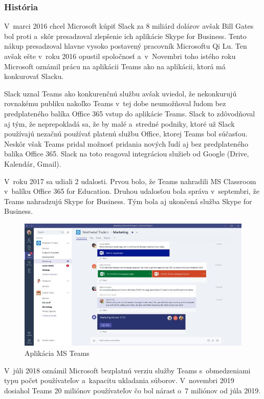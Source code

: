\subsubsection{História}
\indent V marci 2016 chcel Microsoft kúpiť Slack za 8 miliárd dolárov avšak Bill Gates bol proti a skôr presadzoval zlepšenie ich aplikácie Skype for Business. Tento nákup presadzoval hlavne vysoko postavený pracovník Microsoftu Qi Lu. Ten avšak ešte v roku 2016 opustil spoločnosť a v Novembri toho istého roku Microsoft oznámil prácu na aplikácii Teams ako na aplikácii, ktorá má konkurovať Slacku. 

\indent Slack uznal Teams ako konkurenčnú službu avšak uviedol, že nekonkurujú rovnakému publiku nakoľko Teams v tej dobe neumožňoval ľudom bez predplateného balíka Office 365 vstup do aplikácie Teams. Slack to zdôvodňoval aj tým, že neprepokladá sa, že by malé a stredné podniky, ktoré už Slack používajú nezačnú používať platenú službu Office, ktorej Teams bol súčasťou. Neskôr však Teams pridal možnosť pridania nových ľudí aj bez predplateného balíka Office 365. Slack na toto reagoval integráciou služieb od Google (Drive, Kalendár, Gmail). 

\indent V roku 2017 sa udiali 2 udalosti. Prvou bolo, že Teams nahradili MS Classroom v balíku Office 365 for Education. Druhou udalosťou bola správa v septembri, že Teams nahradzujú Skype for Business. Tým bola aj ukončená služba Skype for Business. 

\begin{figure}[H]
    \centering
    \includegraphics[scale=0.70]{img/obr-ms-teams.jpg}
    \caption{Aplikácia MS Teams}
    \label{fig:img-ms-teams}
\end{figure}

\indent V júli 2018 oznámil Microsoft bezplatnú verziu služby Teams s obmedzeniami typu počet používateľov a kapacitu ukladania súborov. V novembri 2019 dosiahol Teams 20 miliónov používateľov čo bol nárast o 7 miliónov od júla 2019. 

